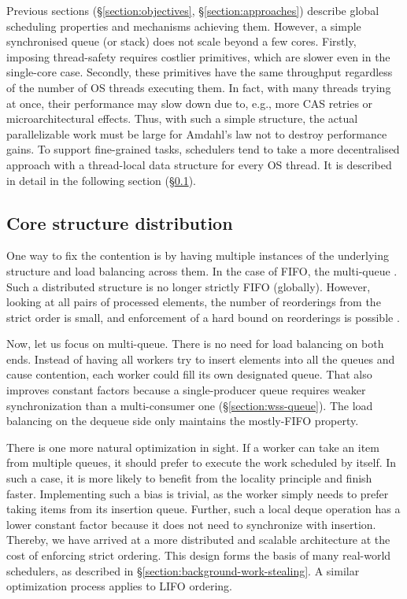 \documentclass[12pt,a4paper,twoside]{report}
\begin{document}
Previous sections (\S\ref{section:objectives}, \S\ref{section:approaches}) describe global scheduling properties and mechanisms achieving them. However, a simple synchronised queue (or stack) does not scale beyond a few cores. Firstly, imposing thread-safety requires costlier primitives, which are slower even in the single-core case. Secondly, these primitives have the same throughput regardless of the number of OS threads executing them. In fact, with many threads trying at once, their performance may slow down due to, e.g., more CAS retries or microarchitectural effects. Thus, with such a simple structure, the actual parallelizable work must be large for Amdahl's law \cite{amdahl} not to destroy performance gains. To support fine-grained tasks, schedulers tend to take a more decentralised approach with a thread-local data structure for every OS thread. It is described in detail in the following section (\S\ref{section:core_struct_dist}).

\subsection{Core structure distribution}
\label{section:core_struct_dist}

One way to fix the contention is by having multiple instances of the underlying structure and load balancing across them. In the case of FIFO, the multi-queue \cite{Postnikova2022}. Such a distributed structure is no longer strictly FIFO (globally). However, looking at all pairs of processed elements, the number of reorderings from the strict order is small, and enforcement of a hard bound on reorderings is possible \cite{Kirsch2013}. 

Now, let us focus on multi-queue. There is no need for load balancing on both ends. Instead of having all workers try to insert elements into all the queues and cause contention, each worker could fill its own designated queue. That also improves constant factors because a single-producer queue requires weaker synchronization than a multi-consumer one (\S\ref{section:wss-queue}). The load balancing on the dequeue side only maintains the mostly-FIFO property. 

There is one more natural optimization in sight. If a worker can take an item from multiple queues, it should prefer to execute the work scheduled by itself. In such a case, it is more likely to benefit from the locality principle and finish faster. Implementing such a bias is trivial, as the worker simply needs to prefer taking items from its insertion queue. Further, such a local deque operation has a lower constant factor because it does not need to synchronize with insertion. Thereby, we have arrived at a more distributed and scalable architecture at the cost of enforcing strict ordering. This design forms the basis of many real-world schedulers, as described in \S\ref{section:background-work-stealing}. A similar optimization process applies to LIFO ordering.
\end{document}
